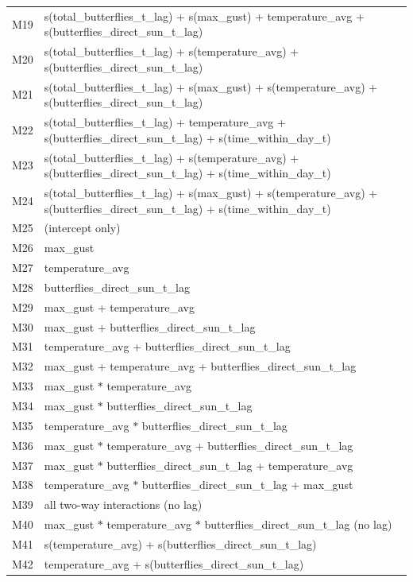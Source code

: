 \documentclass[insects,article,submit,pdftex,moreauthors]{Definitions/mdpi}
\begin{document}
\begin{appendix}
\begin{longtable}{ll}
M19 & s(total\_butterflies\_t\_lag) + s(max\_gust) + temperature\_avg + s(butterflies\_direct\_sun\_t\_lag) \\
M20 & s(total\_butterflies\_t\_lag) + s(temperature\_avg) + s(butterflies\_direct\_sun\_t\_lag) \\
M21 & s(total\_butterflies\_t\_lag) + s(max\_gust) + s(temperature\_avg) + s(butterflies\_direct\_sun\_t\_lag) \\
M22 & s(total\_butterflies\_t\_lag) + temperature\_avg + s(butterflies\_direct\_sun\_t\_lag) + s(time\_within\_day\_t) \\
M23 & s(total\_butterflies\_t\_lag) + s(temperature\_avg) + s(butterflies\_direct\_sun\_t\_lag) + s(time\_within\_day\_t) \\
M24 & s(total\_butterflies\_t\_lag) + s(max\_gust) + s(temperature\_avg) + s(butterflies\_direct\_sun\_t\_lag) + s(time\_within\_day\_t) \\
M25 & (intercept only) \\
M26 & max\_gust \\
M27 & temperature\_avg \\
M28 & butterflies\_direct\_sun\_t\_lag \\
M29 & max\_gust + temperature\_avg \\
M30 & max\_gust + butterflies\_direct\_sun\_t\_lag \\
M31 & temperature\_avg + butterflies\_direct\_sun\_t\_lag \\
M32 & max\_gust + temperature\_avg + butterflies\_direct\_sun\_t\_lag \\
M33 & max\_gust $*$ temperature\_avg \\
M34 & max\_gust $*$ butterflies\_direct\_sun\_t\_lag \\
M35 & temperature\_avg $*$ butterflies\_direct\_sun\_t\_lag \\
M36 & max\_gust $*$ temperature\_avg + butterflies\_direct\_sun\_t\_lag \\
M37 & max\_gust $*$ butterflies\_direct\_sun\_t\_lag + temperature\_avg \\
M38 & temperature\_avg $*$ butterflies\_direct\_sun\_t\_lag + max\_gust \\
M39 & all two-way interactions (no lag) \\
M40 & max\_gust $*$ temperature\_avg $*$ butterflies\_direct\_sun\_t\_lag (no lag) \\
M41 & s(temperature\_avg) + s(butterflies\_direct\_sun\_t\_lag) \\
M42 & temperature\_avg + s(butterflies\_direct\_sun\_t\_lag) \\

\end{longtable}
\end{appendix}
\end{document}
